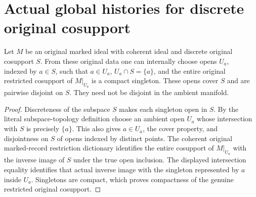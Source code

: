 \section{Actual global histories for discrete original cosupport}
\label{sec:hironaka-discrete-cosupport-canonical-history}

\begin{theorem}
\label{hir:original-discrete-cosupport-isolating-opens}
\leanok
Let $M$ be an original marked ideal with coherent ideal and
discrete original cosupport $S$. From these original data
one can internally choose opens $U_a$, indexed by $a\in S$,
such that $a\in U_a$, $U_a\cap S=\{a\}$, and the entire
original restricted cosupport of $M|_{U_a}$ is a compact
singleton. These opens cover $S$ and are pairwise disjoint
on $S$. They need not be disjoint in the ambient manifold.
\end{theorem}
\begin{proof}
Discreteness of the subspace $S$ makes each singleton open
in $S$. By the literal subspace-topology definition choose
an ambient open $U_a$ whose intersection with $S$ is precisely
$\{a\}$. This also gives $a\in U_a$, the cover property,
and disjointness on $S$ of opens indexed by distinct points.
The coherent original marked-record restriction dictionary
identifies the entire cosupport of $M|_{U_a}$ with the
inverse image of $S$ under the true open inclusion. The
displayed intersection equality identifies that actual
inverse image with the singleton represented by $a$ inside
$U_a$. Singletons are compact, which proves compactness
of the genuine restricted original cosupport.
\end{proof}

